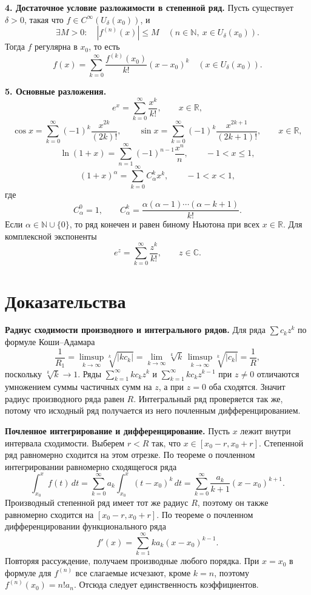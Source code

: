 \documentclass[12pt,a4paper]{article}
\newcommand{\R}{\mathbb{R}}
\newcommand{\CC}{\mathbb{C}}
\newcommand{\N}{\mathbb{N}}
\newcommand{\dd}{\,d}
\begin{document}
\textbf{4. Достаточное условие разложимости в степенной ряд.}
Пусть существует \(\delta>0\), такая что \(f\in C^\infty(U_\delta(x_0))\), и
\[
  \exists M>0:\quad
  |f^{(n)}(x)|\le M
  \quad(n\in\N,\ x\in U_\delta(x_0)).
\]
Тогда \(f\) регулярна в \(x_0\), то есть
\[
  f(x)=\sum_{k=0}^{\infty}\frac{f^{(k)}(x_0)}{k!}(x-x_0)^k
  \quad (x\in U_\delta(x_0)).
\]

\textbf{5. Основные разложения.}
\[
  e^x=\sum_{k=0}^{\infty}\frac{x^k}{k!},
  \qquad x\in\R,
\]
\[
  \cos x=\sum_{k=0}^{\infty}(-1)^k\frac{x^{2k}}{(2k)!},
  \qquad
  \sin x=\sum_{k=0}^{\infty}(-1)^k\frac{x^{2k+1}}{(2k+1)!},
  \qquad x\in\R,
\]
\[
  \ln(1+x)=\sum_{n=1}^{\infty}(-1)^{n-1}\frac{x^n}{n},
  \qquad -1<x\le1,
\]
\[
  (1+x)^\alpha=\sum_{k=0}^{\infty}C_\alpha^k x^k,
  \qquad -1<x<1,
\]
где
\[
  C_\alpha^0=1,\qquad
  C_\alpha^k=\frac{\alpha(\alpha-1)\cdots(\alpha-k+1)}{k!}.
\]
Если \(\alpha\in\N\cup\{0\}\), то ряд конечен и равен биному Ньютона при всех
\(x\in\R\). Для комплексной экспоненты
\[
  e^z=\sum_{k=0}^{\infty}\frac{z^k}{k!},
  \qquad z\in\CC.
\]

\section*{Доказательства}

\textbf{Радиус сходимости производного и интегрального рядов.}
Для ряда \(\sum c_kz^k\) по формуле Коши--Адамара
\[
  \frac1{R_1}
  =
  \limsup_{k\to\infty}\sqrt[k]{|kc_k|}
  =
  \lim_{k\to\infty}\sqrt[k]{k}\,
  \limsup_{k\to\infty}\sqrt[k]{|c_k|}
  =
  \frac1R,
\]
поскольку \(\sqrt[k]{k}\to1\). Ряды
\(\sum_{k=1}^{\infty}kc_kz^k\) и
\(\sum_{k=1}^{\infty}kc_kz^{k-1}\) при \(z\ne0\) отличаются умножением суммы
частичных сумм на \(z\), а при \(z=0\) оба сходятся. Значит радиус
производного ряда равен \(R\). Интегральный ряд проверяется так же, потому
что исходный ряд получается из него почленным дифференцированием.

\textbf{Почленное интегрирование и дифференцирование.}
Пусть \(x\) лежит внутри интервала сходимости. Выберем \(r<R\) так, что
\(x\in[x_0-r,x_0+r]\). Степенной ряд равномерно сходится на этом отрезке.
По теореме о почленном интегрировании равномерно сходящегося ряда
\[
  \int_{x_0}^{x}f(t)\dd t
  =
  \sum_{k=0}^{\infty}a_k\int_{x_0}^{x}(t-x_0)^k\dd t
  =
  \sum_{k=0}^{\infty}\frac{a_k}{k+1}(x-x_0)^{k+1}.
\]
Производный степенной ряд имеет тот же радиус \(R\), поэтому он также
равномерно сходится на \([x_0-r,x_0+r]\). По теореме о почленном
дифференцировании функционального ряда
\[
  f'(x)=\sum_{k=1}^{\infty}ka_k(x-x_0)^{k-1}.
\]
Повторяя рассуждение, получаем производные любого порядка. При \(x=x_0\)
в формуле для \(f^{(n)}\) все слагаемые исчезают, кроме \(k=n\), поэтому
\(f^{(n)}(x_0)=n!a_n\). Отсюда следует единственность коэффициентов.
\end{document}
